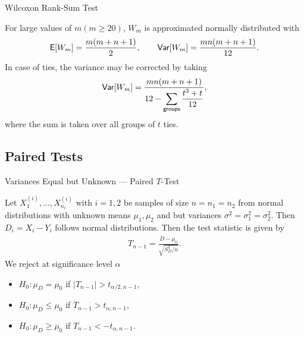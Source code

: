 \begin{frame}{Wilcoxon Rank-Sum Test}

\justifying
{} For large values of $m (m\geq 20)$, $W_m$ is approximated normally distributed with
\begin{align*}
\mathsf{E}[W_m] = \frac{m(m+n+1)}{2}, \qquad \mathsf{Var}[W_m] = \frac{mn(m+n+1)}{12}.
\end{align*}
In case of ties, the variance may be corrected by taking
\begin{align*}
\mathsf{Var}[W_m] = \frac{mn(m+n+1)}{12-\displaystyle \sum_{\mathsf{groups}} \frac{t^3+t}{12}},
\end{align*}
where the sum is taken over all groups of $t$ ties.


\end{frame}



\subsection{Paired Tests}


\begin{frame}{Variances Equal but Unknown --- Paired $T$-Test}

\justifying
{} Let $X_1^{(i)}, \ldots, X_{n_i}^{(i)}$ with $i = 1, 2$ be samples of size $n = n_1 = n_2$ from normal distributions with unknown means $\mu_1, \mu_2$ and  but  variances $\sigma^2 = \sigma_1^2 = \sigma_2^2$. Then $D_i = X_i - Y_i$ follows normal distributions. Then the test statistic is given by
\begin{align*}
T_{n-1} = \frac{\overline{D} - \mu_0}{\sqrt{S^2_D/n}}.
\end{align*}
We reject at significance level $\alpha$
\begin{itemize}
	\item $H_0: \mu_D = \mu_0$ if $|T_{n-1}| > t_{\alpha/2,n-1}$,
	\item $H_0: \mu_D \leq \mu_0$ if $T_{n-1} > t_{\alpha,n-1}$,
	\item $H_0: \mu_D \geq \mu_0$ if $T_{n-1} < -t_{\alpha,n-1}$.
\end{itemize}


\end{frame}


